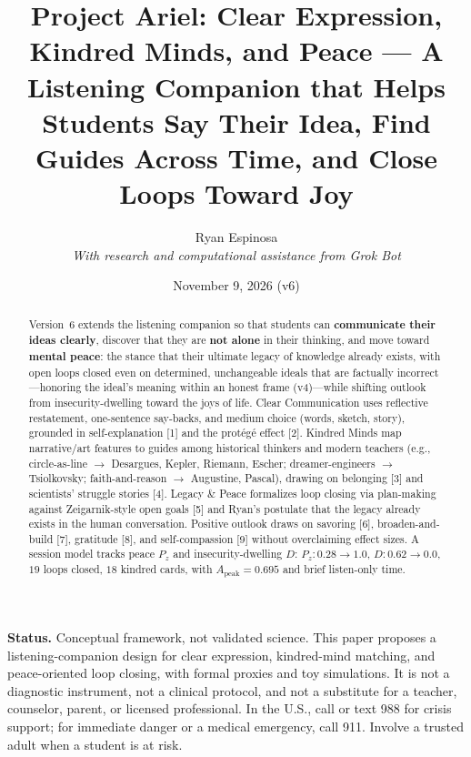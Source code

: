 \documentclass[11pt, a4paper]{article}
\title{Project Ariel: Clear Expression, Kindred Minds, and Peace --- A Listening Companion that Helps Students Say Their Idea, Find Guides Across Time, and Close Loops Toward Joy}
\author{Ryan Espinosa \\ \textit{With research and computational assistance from Grok Bot}}
\date{November 9, 2026 (v6)}
\begin{document}
\maketitle

\noindent\textbf{Status.} Conceptual framework, not validated science. This paper proposes a listening-companion design for clear expression, kindred-mind matching, and peace-oriented loop closing, with formal proxies and toy simulations. It is not a diagnostic instrument, not a clinical protocol, and not a substitute for a teacher, counselor, parent, or licensed professional. In the U.S., call or text 988 for crisis support; for immediate danger or a medical emergency, call 911. Involve a trusted adult when a student is at risk.

\begin{abstract}
Version~6 extends the listening companion so that students can \textbf{communicate their ideas clearly}, discover that they are \textbf{not alone} in their thinking, and move toward \textbf{mental peace}: the stance that their ultimate legacy of knowledge already exists, with open loops closed even on determined, unchangeable ideals that are factually incorrect---honoring the ideal's meaning within an honest frame (v4)---while shifting outlook from insecurity-dwelling toward the joys of life. Clear Communication uses reflective restatement, one-sentence say-backs, and medium choice (words, sketch, story), grounded in self-explanation [1] and the prot\'{e}g\'{e} effect [2]. Kindred Minds map narrative/art features to guides among historical thinkers and modern teachers (e.g., circle-as-line $\rightarrow$ Desargues, Kepler, Riemann, Escher; dreamer-engineers $\rightarrow$ Tsiolkovsky; faith-and-reason $\rightarrow$ Augustine, Pascal), drawing on belonging [3] and scientists' struggle stories [4]. Legacy \& Peace formalizes loop closing via plan-making against Zeigarnik-style open goals [5] and Ryan's postulate that the legacy already exists in the human conversation. Positive outlook draws on savoring [6], broaden-and-build [7], gratitude [8], and self-compassion [9] without overclaiming effect sizes. A session model tracks peace $P_z$ and insecurity-dwelling $D$: $P_z: 0.28\rightarrow 1.0$, $D: 0.62\rightarrow 0.0$, $19$ loops closed, $18$ kindred cards, with $A_{\mathrm{peak}}=0.695$ and brief listen-only time.
\end{abstract}
\end{document}
